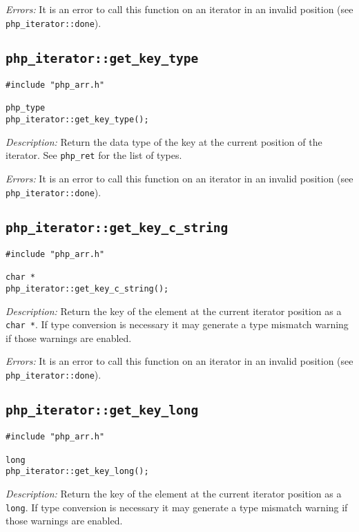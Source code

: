 \documentclass[11pt,titlepage]{article}
\begin{document}
\emph{Errors:} It is an error to call this function on an iterator in an invalid position (see \verb|php_iterator::done|).


\subsection{\texttt{php\_iterator::get\_key\_type}}

\begin{verbatim}
#include "php_arr.h"

php_type 
php_iterator::get_key_type();
\end{verbatim}

\emph{Description:} Return the data type of the key at the current position of the iterator. See \verb|php_ret| for the list of types.

\emph{Errors:} It is an error to call this function on an iterator in an invalid position (see \verb|php_iterator::done|).


\subsection{\texttt{php\_iterator::get\_key\_c\_string}}

\begin{verbatim}
#include "php_arr.h"

char *
php_iterator::get_key_c_string();
\end{verbatim}

\emph{Description:} Return the key of the element at the current iterator position as a \verb|char *|. If type conversion is necessary it may generate a type mismatch warning if those warnings are enabled.

\emph{Errors:} It is an error to call this function on an iterator in an invalid position (see \verb|php_iterator::done|).


\subsection{\texttt{php\_iterator::get\_key\_long}}

\begin{verbatim}
#include "php_arr.h"

long 
php_iterator::get_key_long();
\end{verbatim}

\emph{Description:} Return the key of the element at the current iterator position as a \verb|long|. If type conversion is necessary it may generate a type mismatch warning if those warnings are enabled.
\end{document}
